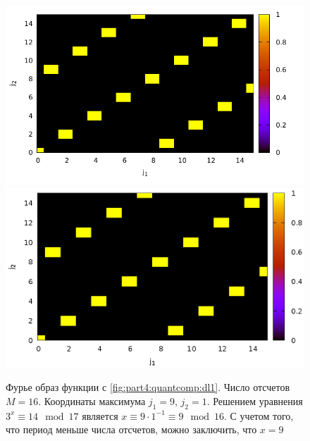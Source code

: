 \begin{figure}
\centering

\ifpdf
\includegraphics[angle=0]
{./part4/quantcomp/picdiscretlog2.pdf}
\else
\includegraphics[angle=0]
{./part4/quantcomp/picdiscretlog2.eps}
\fi

%

\caption{Фурье образ функции с \autoref{fig:part4:quantcomp:dl1}.
  Число отсчетов $M=16$. Координаты максимума $j_1 = 9$, $j_2 = 1$. 
Решением уравнения $3^x \equiv 14 \mod 17$
является $x \equiv 9 \cdot 1^{-1} \equiv 9 \mod 16$. С учетом того,
что период меньше числа отсчетов, можно заключить, что $x = 9$} 
\label{fig:part4:quantcomp:dl2}
\end{figure}
